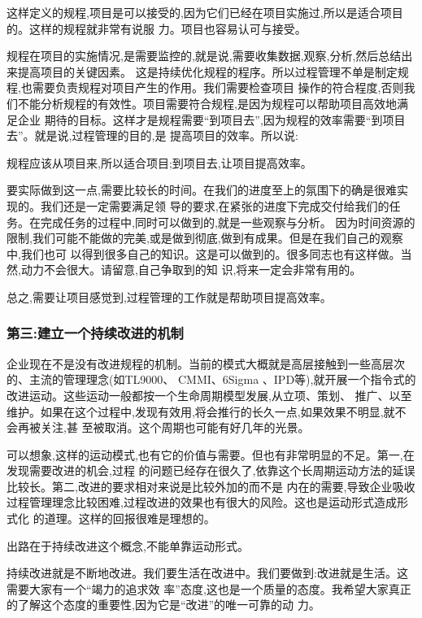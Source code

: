 \documentclass[11pt]{article}
\begin{document}
这样定义的规程,项目是可以接受的,因为它们已经在项目实施过,所以是适合项目的。这样的规程就非常有说服
力。项目也容易认可与接受。

规程在项目的实施情况,是需要监控的,就是说,需要收集数据,观察,分析,然后总结出来提高项目的关键因素。
这是持续优化规程的程序。所以过程管理不单是制定规程,也需要负责规程对项目产生的作用。我们需要检查项目
操作的符合程度,否则我们不能分析规程的有效性。项目需要符合规程,是因为规程可以帮助项目高效地满足企业
期待的目标。这样才是规程需要``到项目去'',因为规程的效率需要``到项目去''。就是说,过程管理的目的,是
提高项目的效率。所以说:

规程应该从项目来,所以适合项目;到项目去,让项目提高效率。

要实际做到这一点,需要比较长的时间。在我们的进度至上的氛围下的确是很难实现的。我们还是一定需要满足领
导的要求,在紧张的进度下完成交付给我们的任务。在完成任务的过程中,同时可以做到的,就是一些观察与分析。
因为时间资源的限制,我们可能不能做的完美,或是做到彻底,做到有成果。但是在我们自己的观察中,我们也可
以得到很多自己的知识。这是可以做到的。很多同志也有这样做。当然,动力不会很大。请留意,自己争取到的知
识,将来一定会非常有用的。

总之,需要让项目感觉到,过程管理的工作就是帮助项目提高效率。

\subsubsection{第三:建立一个持续改进的机制}

企业现在不是没有改进规程的机制。当前的模式大概就是高层接触到一些高层次的、主流的管理理念(如TL9000、
CMMI、6Sigma 、IPD等),就开展一个指令式的改进运动。这些运动一般都按一个生命周期模型发展,从立项、策划、
推广、以至维护。如果在这个过程中,发现有效用,将会推行的长久一点,如果效果不明显,就不会再被关注,甚
至被取消。这个周期也可能有好几年的光景。

可以想象,这样的运动模式,也有它的价值与需要。但也有非常明显的不足。第一,在发现需要改进的机会,过程
的问题已经存在很久了,依靠这个长周期运动方法的延误比较长。第二,改进的要求相对来说是比较外加的而不是
内在的需要,导致企业吸收过程管理理念比较困难,过程改进的效果也有很大的风险。这也是运动形式造成形式化
的道理。这样的回报很难是理想的。

出路在于持续改进这个概念,不能单靠运动形式。

持续改进就是不断地改进。我们要生活在改进中。我们要做到:改进就是生活。这需要大家有一个``竭力的追求效
率''态度,这也是一个质量的态度。我希望大家真正的了解这个态度的重要性,因为它是``改进''的唯一可靠的动
力。
\end{document}
